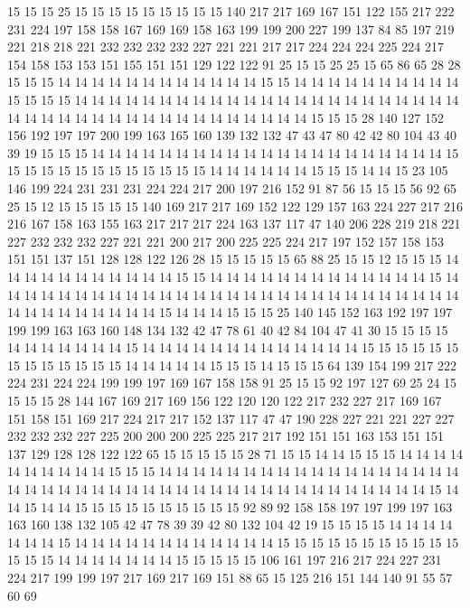 15 15 15 25 15 15 15 15 15 15 15 15 15 140 217 217 169 167 151 122
155 217 222 231 224 197 158 158 167 169 169 158 163 199 199 200 227 199 137 84
85 197 219 221 218 218 221 232 232 232 232 227 221 221 217 217 224 224 224 225
224 217 154 158 153 153 151 155 151 151 129 122 122 91 25 15 15 25 25 15
65 86 65 28 28 15 15 15 14 14 14 14 14 14 14 14 14 14 14 14
15 15 14 14 14 14 14 14 14 14 14 14 15 15 15 15 14 14 14 14
14 14 14 14 14 14 14 14 14 14 14 14 14 14 14 14 14 14 14 14
14 14 14 14 14 14 14 14 14 14 14 14 14 14 14 14 14 15 15 15
28 140 127 152 156 192 197 197 200 199 163 165 160 139 132 132 47 43 47 80
42 42 80 104 43 40 39 19 15 15 15 14 14 14 14 14 14 14 14 14
14 14 14 14 14 14 14 14 14 14 14 14 15 15 15 15 15 15 15 15
15 15 15 15 15 14 14 14 14 14 14 15 15 15 14 14 15 23 105 146
199 224 231 231 231 224 224 217 200 197 216 152 91 87 56 15 15 15 56 92
65 25 15 12 15 15 15 15 15 140 169 217 217 169 152 122 129 157 163 224
227 217 216 216 167 158 163 155 163 217 217 217 224 163 137 117 47 140 206 228
219 218 221 227 232 232 232 227 221 221 200 217 200 225 225 224 217 197 152 157
158 153 151 151 137 151 128 128 122 126 28 15 15 15 15 15 65 88 25 15
15 12 15 15 15 14 14 14 14 14 14 14 14 14 14 14 15 15 14 14
14 14 14 14 14 14 14 14 14 14 14 15 14 14 14 14 14 14 14 14
14 14 14 14 14 14 14 14 14 14 14 14 14 14 14 14 14 14 14 14
14 14 14 14 14 14 14 14 14 15 14 14 14 15 15 15 25 140 145 152
163 192 197 197 199 199 163 163 160 148 134 132 42 47 78 61 40 42 84 104
47 41 30 15 15 15 15 14 14 14 14 14 14 14 15 14 14 14 14 14
14 14 14 14 14 14 14 14 15 15 15 15 15 15 15 15 15 15 15 15
15 14 14 14 14 14 15 15 15 14 15 15 15 64 139 154 199 217 222 224
231 224 224 199 199 197 169 167 158 158 91 25 15 15 92 197 127 69 25 24
15 15 15 15 28 144 167 169 217 169 156 122 120 120 122 217 232 227 217 169
167 151 158 151 169 217 224 217 217 152 137 117 47 47 190 228 227 221 221 227
227 232 232 232 227 225 200 200 200 225 225 217 217 192 151 151 163 153 151 151
137 129 128 128 122 122 65 15 15 15 15 15 28 71 15 15 14 14 15 15
15 14 14 14 14 14 14 14 14 14 14 15 15 15 14 14 14 14 14 14
14 14 14 14 14 14 14 14 14 14 14 14 14 14 14 14 14 14 14 14
14 14 14 14 14 14 14 14 14 14 14 14 14 14 14 14 14 15 14 14
15 14 14 15 15 15 15 15 15 15 15 15 15 92 89 92 158 158 197 197
199 197 163 163 160 138 132 105 42 47 78 39 39 42 80 132 104 42 19 15
15 15 15 14 14 14 14 14 14 14 15 14 14 14 14 14 14 14 14 14
14 14 14 15 15 15 15 15 15 15 15 15 15 15 15 15 15 14 14 14
14 14 14 14 15 15 15 15 15 106 161 197 216 217 224 227 231 224 217 199
199 197 217 169 217 169 151 88 65 15 125 216 151 144 140 91 55 57 60 69
